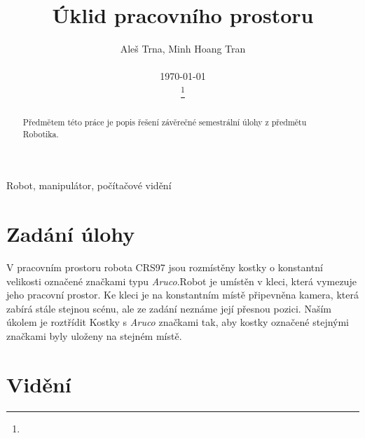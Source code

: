 \documentclass[journal,twoside,web]{ieeecolor}
\begin{document}
\title{Úklid pracovního prostoru}
\author{Aleš Trna, Minh Hoang Tran \\ \begin{center}
    \today
\end{center}
\thanks{}}

\maketitle

\begin{abstract}
    Předmětem této práce je popis řešení závěrečné semestrální úlohy z předmětu Robotika.
\end{abstract}

\begin{IEEEkeywords}
    Robot, manipulátor, počítačové vidění
    \end{IEEEkeywords}

\section{Zadání úlohy}
    V pracovním prostoru robota CRS97 jsou rozmístěny kostky o konstantní velikosti označené
    značkami typu \textit{Aruco}.Robot je umístěn v kleci, která vymezuje jeho pracovní prostor.
    Ke kleci je na konstantním místě připevněna kamera, která zabírá stále stejnou scénu,
    ale ze zadání neznáme její přesnou pozici. Naším úkolem je roztřídit Kostky s \textit{Aruco}
    značkami tak, aby kostky označené stejnými značkami byly uloženy na stejném místě.

\section{Vidění}
\end{document}
